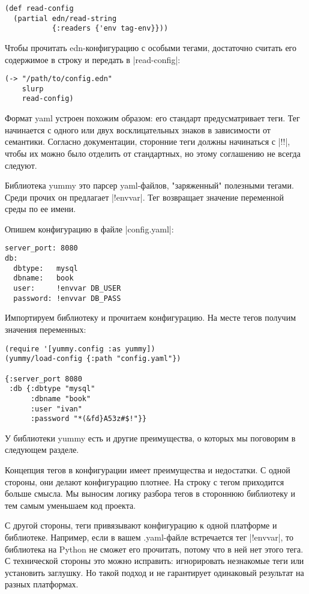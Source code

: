 \begin{verbatim}
(def read-config
  (partial edn/read-string
           {:readers {'env tag-env}}))
\end{verbatim}

Чтобы прочитать edn-конфигурацию с особыми тегами, достаточно считать его
содержимое в строку и передать в \spverb|read-config|:

\begin{verbatim}
(-> "/path/to/config.edn"
    slurp
    read-config)
\end{verbatim}

Формат yaml устроен похожим образом: его стандарт предусматривает теги. Тег
начинается с одного или двух восклицательных знаков в зависимости от
семантики. Согласно документации, сторонние теги должны начинаться с \spverb|!!|, чтобы
их можно было отделить от стандартных, но этому соглашению не всегда следуют.

Библиотека yummy это парсер yaml-файлов, "заряженный" полезными тегами. Среди
прочих он предлагает \spverb|!envvar|. Тег возвращает значение переменной среды по ее
имени.

Опишем конфигурацию в файле \spverb|config.yaml|:

\begin{verbatim}
server_port: 8080
db:
  dbtype:   mysql
  dbname:   book
  user:     !envvar DB_USER
  password: !envvar DB_PASS
\end{verbatim}

Импортируем библиотеку и прочитаем конфигурацию. На месте тегов получим значения
переменных:

\begin{verbatim}
(require '[yummy.config :as yummy])
(yummy/load-config {:path "config.yaml"})

{:server_port 8080
 :db {:dbtype "mysql"
      :dbname "book"
      :user "ivan"
      :password "*(&fd}A53z#$!"}}
\end{verbatim}

У библиотеки yummy есть и другие преимущества, о которых мы поговорим в
следующем разделе.

Концепция тегов в конфигурации имеет преимущества и недостатки. С одной стороны,
они делают конфигурацию плотнее. На строку с тегом приходится больше смысла. Мы
выносим логику разбора тегов в стороннюю библиотеку и тем самым уменьшаем код
проекта.

С другой стороны, теги привязывают конфигурацию к одной платформе и
библиотеке. Например, если в вашем .yaml-файле встречается тег \spverb|!envvar|, то
библиотека на Python не сможет его прочитать, потому что в ней нет этого тега. С
технической стороны это можно исправить: игнорировать незнакомые теги или
установить заглушку. Но такой подход и не гарантирует одинаковый результат на
разных платформах.

